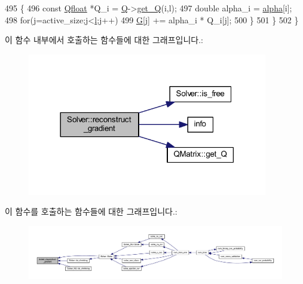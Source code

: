 \begin{DoxyCode}
495             \{
496                 \textcolor{keyword}{const} \hyperlink{svm_8cpp_a8755d90a54ecfb8d15051af3e0542592}{Qfloat} *Q\_i = \hyperlink{class_solver_a2d3461718f0570bdc47f5dfb31d61e0a}{Q}->\hyperlink{class_q_matrix_a87c11086390c81293d2978e042be3d10}{get\_Q}(i,l);
497                 \textcolor{keywordtype}{double} alpha\_i = \hyperlink{class_solver_a00d7a7cefa2504d41c7db6cd7cc6b428}{alpha}[i];
498                 \textcolor{keywordflow}{for}(j=active\_size;j<\hyperlink{class_solver_a88832d45b6de977b1cbb2afd4c0e494c}{l};j++)
499                     \hyperlink{class_solver_ad8ab27068f2e045591970aae1201afe9}{G}[j] += alpha\_i * Q\_i[j];
500             \}
501     \}
502 \}
\end{DoxyCode}


이 함수 내부에서 호출하는 함수들에 대한 그래프입니다.\+:
\nopagebreak
\begin{figure}[H]
\begin{center}
\leavevmode
\includegraphics[width=297pt]{class_solver_a7e34992ede606a336606ae54f6e963e6_cgraph}
\end{center}
\end{figure}




이 함수를 호출하는 함수들에 대한 그래프입니다.\+:
\nopagebreak
\begin{figure}[H]
\begin{center}
\leavevmode
\includegraphics[width=350pt]{class_solver_a7e34992ede606a336606ae54f6e963e6_icgraph}
\end{center}
\end{figure}


